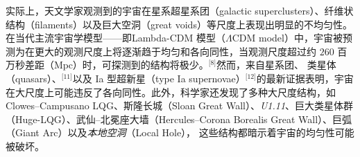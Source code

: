 实际上，天文学家观测到的宇宙在星系超星系团（galactic superclusters）、纤维状结构（filaments）以及巨大空洞（great voids）等尺度上表现出明显的不均匀性。在当代主流宇宙学模型——即Lambda-CDM 模型（$\Lambda$CDM model）中，宇宙被预测为在更大的观测尺度上将逐渐趋于均匀和各向同性，当观测尺度超过约 $260$ 百万秒差距（$\mathrm{Mpc}$）时，可探测到的结构将极少。\(^\text{[8]}\)然而，来自星系团、\cite{ref9,ref10} 类星体（quasars）、\(^\text{[11]}\)以及 Ia 型超新星（type Ia supernovae）\(^\text{[12]}\)的最新证据表明，宇宙在大尺度上可能违反了各向同性。此外，科学家还发现了多种大尺度结构，如 Clowes–Campusano LQG、斯隆长城（Sloan Great Wall）、\emph{U1.11}、巨大类星体群（Huge-LQG）、武仙–北冕座大墙（Hercules–Corona Borealis Great Wall）、巨弧（Giant Arc）以及\emph{本地空洞}（Local Hole），\cite{ref13,ref14,ref15,ref16} 这些结构都暗示着宇宙的均匀性可能被破坏。
